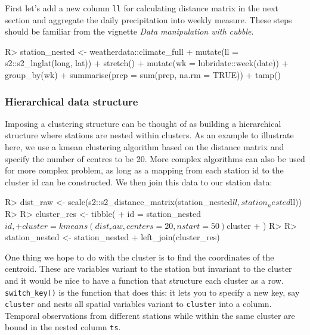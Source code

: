 \documentclass[
]{jss}
\begin{document}
First let's add a new column \texttt{ll} for calculating distance matrix
in the next section and aggregate the daily precipitation into weekly
measure. These steps should be familiar from the vignette \emph{Data
manipulation with cubble}.

\begin{CodeChunk}
\begin{CodeInput}
R> station_nested <- weatherdata::climate_full %
+   mutate(ll = s2::s2_lnglat(long, lat)) %
+   stretch() %
+   mutate(wk = lubridate::week(date)) %
+   group_by(wk) %
+   summarise(prcp = sum(prcp, na.rm = TRUE)) %
+   tamp()
\end{CodeInput}
\end{CodeChunk}

\hypertarget{hierarchical-data-structure}{%
\subsubsection{Hierarchical data
structure}\label{hierarchical-data-structure}}

Imposing a clustering structure can be thought of as building a
hierarchical structure where stations are nested within clusters. As an
example to illustrate here, we use a kmean clustering algorithm based on
the distance matrix and specify the number of centres to be 20. More
complex algorithms can also be used for more complex problem, as long as
a mapping from each station id to the cluster id can be constructed. We
then join this data to our station data:

\begin{CodeChunk}
\begin{CodeInput}
R> dist_raw <- scale(s2::s2_distance_matrix(station_nested$ll, station_nested$ll))
R> 
R> cluster_res <- tibble(
+   id = station_nested$id,
+   cluster = kmeans(dist_raw, centers = 20, nstart = 50)$cluster
+ )
R> 
R> station_nested <- station_nested %
+   left_join(cluster_res)
\end{CodeInput}
\end{CodeChunk}

One thing we hope to do with the cluster is to find the coordinates of
the centroid. These are variables variant to the station but invariant
to the cluster and it would be nice to have a function that structure
each cluster as a row. \texttt{switch\_key()} is the function that does
this: it lets you to specify a new key, say \texttt{cluster} and nests
all spatial variables variant to \texttt{cluster} into a column.
Temporal observations from different stations while within the same
cluster are bound in the nested column \texttt{ts}.
\end{document}
